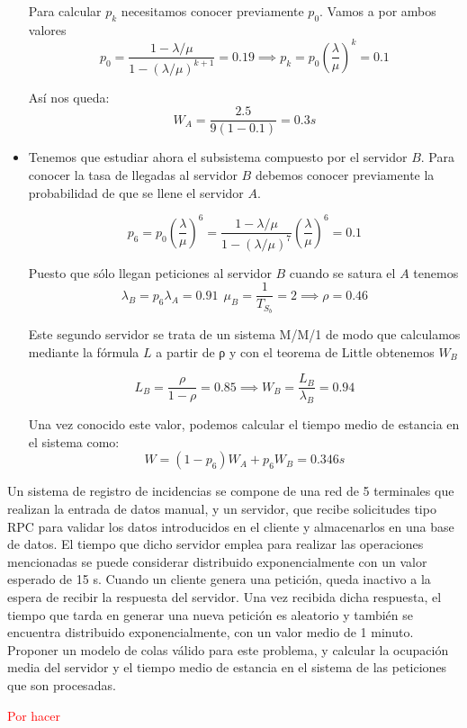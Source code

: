 \begin{problem}[12]
\begin{itemize}
Para calcular $p_k$ necesitamos conocer previamente $p_0$. Vamos a por ambos valores
\[p_0 = \frac{1-λ/μ}{1-(λ/μ)^{k+1}}=0.19 \implies p_k = p_0\left( \frac{λ}{μ}\right)^k=0.1\]

Así nos queda:
\[W_A = \frac{2.5}{9(1-0.1)}=0.3s\]

\item

Tenemos que estudiar ahora el subsistema compuesto por el servidor $B$. Para conocer la tasa de llegadas al servidor $B$ debemos conocer previamente la probabilidad de que se llene el servidor $A$.

\[p_6=p_0\left( \frac{λ}{μ}\right)^6=\frac{1-λ/μ}{1-(λ/μ)^{7}}\left( \frac{λ}{μ}\right)^6=0.1\]

Puesto que sólo llegan peticiones al servidor $B$ cuando se satura el $A$ tenemos
\[λ_B = p_6λ_A=0.91 \ \ μ_B=\frac{1}{T_{S_b}}=2 \implies ρ=0.46\]

Este segundo servidor se trata de un sistema M/M/1 de modo que calculamos mediante la fórmula $L$ a partir de ρ y con el teorema de Little obtenemos $W_B$

\[L_B=\frac{ρ}{1-ρ}=0.85 \implies W_B = \frac{L_B}{λ_B}=0.94\]

Una vez conocido este valor, podemos calcular el tiempo medio de estancia en el sistema como:
\[W = (1-p_6)W_A+p_6W_B=0.346s \]

\end{itemize}

\end{problem}

\begin{problem}[13]

Un sistema de registro de incidencias se compone de una red de 5 terminales que realizan la entrada de datos manual, y un servidor, que recibe solicitudes tipo RPC para validar los datos introducidos en el cliente y almacenarlos en una base de datos. El tiempo que dicho servidor emplea para realizar las operaciones mencionadas se puede considerar distribuido exponencialmente con un valor esperado de 15 s. Cuando un cliente genera una petición, queda inactivo a la espera de recibir la respuesta del servidor. Una vez recibida dicha respuesta, el tiempo que tarda en generar una nueva petición es aleatorio y también se encuentra distribuido exponencialmente, con un valor medio de 1 minuto. Proponer un modelo de colas válido para este problema, y calcular la ocupación media del servidor y el tiempo medio de estancia en el sistema de las peticiones que son procesadas.

\solution

\textcolor{red}{Por hacer}

\end{problem}

